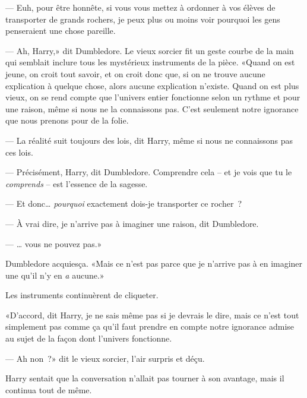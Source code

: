 --- Euh, pour être honnête, si vous vous mettez à ordonner à vos élèves de transporter de grands rochers, je peux plus ou moins voir pourquoi les gens penseraient une chose pareille.

--- Ah, Harry,» dit Dumbledore. Le vieux sorcier fit un geste courbe de la main qui semblait inclure tous les mystérieux instruments de la pièce. «Quand on est jeune, on croit tout savoir, et on croit donc que, si on ne trouve aucune explication à quelque chose, alors aucune explication n'existe. Quand on est plus vieux, on se rend compte que l'univers entier fonctionne selon un rythme et pour une raison, même si nous ne la connaissons pas. C'est seulement notre ignorance que nous prenons pour de la folie.

--- La réalité suit toujours des lois, dit Harry, même si nous ne connaissons pas ces lois.

--- Précisément, Harry, dit Dumbledore. Comprendre cela -- et je vois que tu le \emph{comprends} -- est l'essence de la sagesse.

--- Et donc… \emph{pourquoi} exactement dois-je transporter ce rocher~?

--- À vrai dire, je n'arrive pas à imaginer une raison, dit Dumbledore.

--- … vous ne pouvez pas.»

Dumbledore acquiesça. «Mais ce n'est pas parce que je n'arrive pas à en imaginer une qu'il n'y en \emph{a} aucune.»

Les instruments continuèrent de cliqueter.

«D'accord, dit Harry, je ne sais même pas si je devrais le dire, mais ce n'est tout simplement pas comme ça qu'il faut prendre en compte notre ignorance admise au sujet de la façon dont l'univers fonctionne.

--- Ah non~?» dit le vieux sorcier, l'air surpris et déçu.

Harry sentait que la conversation n'allait pas tourner à son avantage, mais il continua tout de même.

